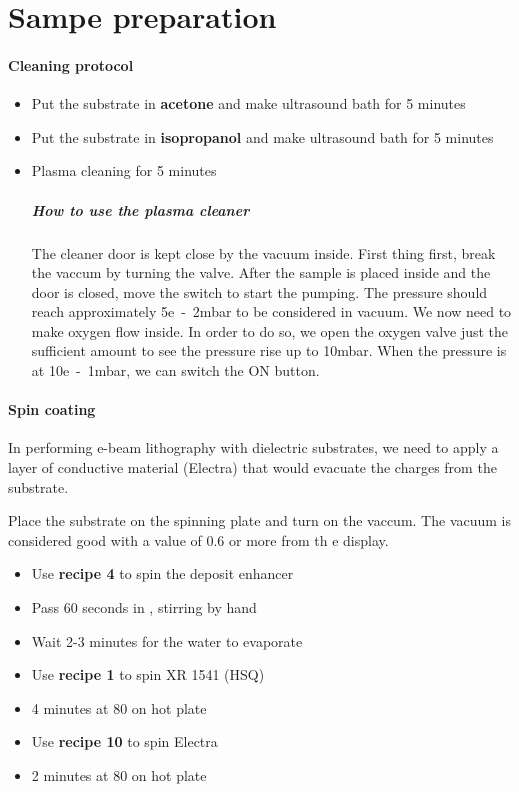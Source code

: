 \documentclass[a4paper]{article}
\begin{document}
\section{Sampe preparation}

\paragraph{Cleaning protocol}
\begin{itemize}
  \item Put the substrate in \textbf{acetone} and make ultrasound bath for 5 minutes
  \item Put the substrate in \textbf{isopropanol} and make ultrasound bath for 5 minutes
  \item Plasma cleaning for 5 minutes
\subparagraph{How to use the plasma cleaner}
The cleaner door is kept close by the vacuum inside. First thing first, break the vaccum by turning the valve. After the sample is placed inside and the door is closed, move the switch to start the pumping. The pressure should reach approximately \unit{5e-2}{}mbar to be considered in vacuum. We now need to make oxygen flow inside. In order to do so, we open the oxygen valve just the sufficient amount to see the pressure rise up to \unit{10}{}mbar. When the pressure is at \unit{10e-1}{}mbar, we can switch the ON button.
\end{itemize}
\paragraph{Spin coating}
In performing e-beam lithography with dielectric substrates, we need to apply a layer of conductive material (Electra) that would evacuate the charges from the substrate.


Place the substrate on the spinning plate and turn on the vaccum. The vacuum is considered good with a value of 0.6 or more from th e display.
\begin{itemize}
  \item Use \textbf{recipe 4} to spin the deposit enhancer
  \item Pass 60 seconds in , stirring by hand
  \item Wait 2-3 minutes for the water to evaporate
  \item Use \textbf{recipe 1} to spin XR 1541 (HSQ)
  \item 4 minutes at \unit{80}{\celsius} on hot plate
  \item Use \textbf{recipe 10} to spin Electra
  \item 2 minutes at \unit{80}{\celsius} on hot plate
\end{itemize}
\end{document}
